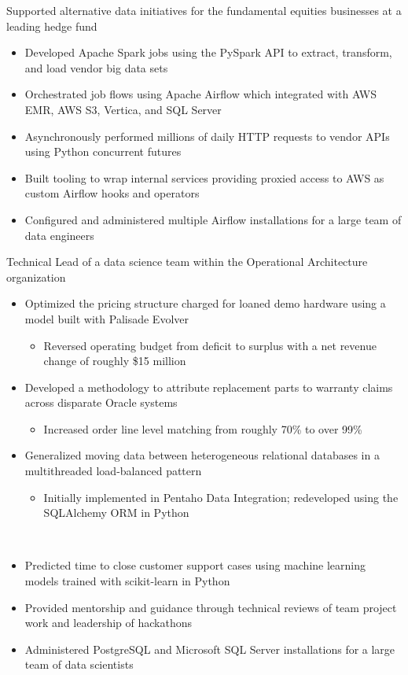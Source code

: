 \documentclass[10pt,a4paper,sans]{moderncv}        %
\begin{document}
{Supported alternative data initiatives for the fundamental equities businesses at a leading hedge fund
\begin{itemize}
	\item Developed Apache Spark jobs using the PySpark API to extract, transform, and load vendor big data sets
	\item Orchestrated job flows using Apache Airflow which integrated with AWS EMR, AWS S3, Vertica, and SQL Server
	\item Asynchronously performed millions of daily HTTP requests to vendor APIs using Python concurrent futures
	\item Built tooling to wrap internal services providing proxied access to AWS as custom Airflow hooks and operators
	\item Configured and administered multiple Airflow installations for a large team of data engineers
\end{itemize}}

{Technical Lead of a data science team within the Operational Architecture organization
\begin{itemize}
	\item Optimized the pricing structure charged for loaned demo hardware using a model built with Palisade Evolver
	\begin{itemize}
		\item Reversed operating budget from deficit to surplus with a net revenue change of roughly \$15 million
	\end{itemize}
	\item Developed a methodology to attribute replacement parts to warranty claims across disparate Oracle systems
	\begin{itemize}
		\item Increased order line level matching from roughly 70\% to over 99\%
	\end{itemize}
	\item Generalized moving data between heterogeneous relational databases in a multithreaded load-balanced pattern
	\begin{itemize}
		\item Initially implemented in Pentaho Data Integration; redeveloped using the SQLAlchemy ORM in Python
	\end{itemize}
􏰂	\item Predicted time to close customer support cases using machine learning models trained with scikit-learn in Python
	\item Provided mentorship and guidance through technical reviews of team project work and leadership of hackathons
	\item Administered PostgreSQL and Microsoft SQL Server installations for a large team of data scientists
\end{itemize}}
\end{document}
